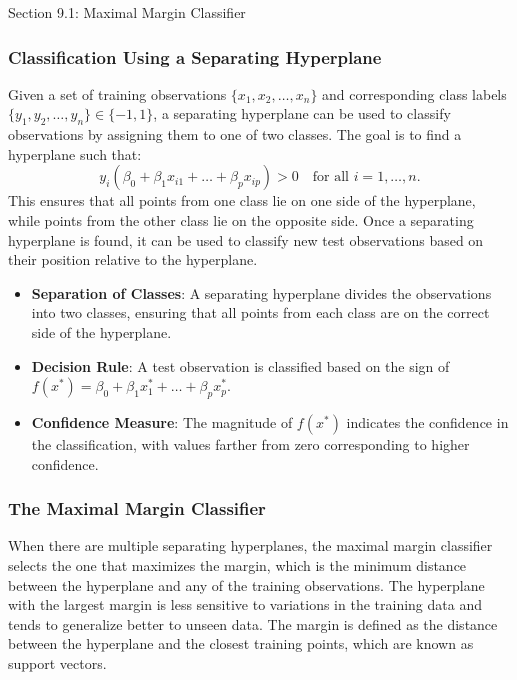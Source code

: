 \begin{notes}{Section 9.1: Maximal Margin Classifier}
    \subsubsection*{Classification Using a Separating Hyperplane}
    
    Given a set of training observations $\{x_1, x_2, \dots, x_n\}$ and corresponding class labels $\{y_1, y_2, \dots, y_n\} \in \{-1, 1\}$, a separating hyperplane can be used to classify observations by 
    assigning them to one of two classes. The goal is to find a hyperplane such that:
    \[
    y_i (\beta_0 + \beta_1 x_{i1} + \dots + \beta_p x_{ip}) > 0 \quad \text{for all } i = 1, \dots, n.
    \]
    This ensures that all points from one class lie on one side of the hyperplane, while points from the other class lie on the opposite side. Once a separating hyperplane is found, it can be used to classify 
    new test observations based on their position relative to the hyperplane.
    
    \begin{highlight}
        \begin{itemize}
            \item \textbf{Separation of Classes}: A separating hyperplane divides the observations into two classes, ensuring that all points from each class are on the correct side of the hyperplane.
            \item \textbf{Decision Rule}: A test observation is classified based on the sign of $f(x^*) = \beta_0 + \beta_1 x^*_1 + \dots + \beta_p x^*_p$.
            \item \textbf{Confidence Measure}: The magnitude of $f(x^*)$ indicates the confidence in the classification, with values farther from zero corresponding to higher confidence.
        \end{itemize}
    \end{highlight}
    
    \subsubsection*{The Maximal Margin Classifier}
    
    When there are multiple separating hyperplanes, the maximal margin classifier selects the one that maximizes the margin, which is the minimum distance between the hyperplane and any of the training 
    observations. The hyperplane with the largest margin is less sensitive to variations in the training data and tends to generalize better to unseen data. The margin is defined as the distance between the 
    hyperplane and the closest training points, which are known as support vectors.
    

\end{notes}

